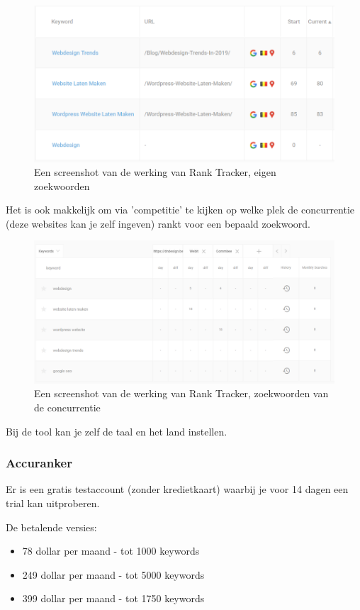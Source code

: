 \begin{figure}[h!]
\centering
\includegraphics[width=\linewidth]{img/ranktracker.PNG}
\caption{Een screenshot van de werking van Rank Tracker, eigen zoekwoorden
\autocite{ranktracker}}
\end{figure}

Het is ook makkelijk om via 'competitie' te kijken op welke plek de concurrentie (deze websites kan je zelf ingeven) rankt voor een bepaald zoekwoord.

\begin{figure}[h!]
\centering
\includegraphics[width=\linewidth]{img/ranktrackercom.PNG}
\caption{Een screenshot van de werking van Rank Tracker, zoekwoorden van de concurrentie
\autocite{ranktracker}}
\end{figure}

Bij de tool kan je zelf de taal en het land instellen. 

\subsubsection{Accuranker}
\label{ch: Accuranker}
Er is een gratis testaccount (zonder kredietkaart) waarbij je voor 14 dagen een trial kan uitproberen. 

De betalende versies: 
\begin{itemize}
\item 78 dollar per maand - tot 1000 keywords
\item 249 dollar per maand - tot 5000 keywords
\item 399 dollar per maand - tot 1750 keywords
\end{itemize}

